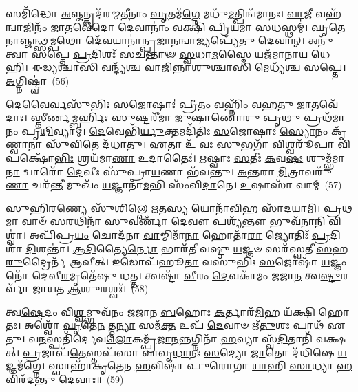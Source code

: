 {\anuvakamend[{𑌰\-\ul{𑌕𑍍𑌷𑌾}\-\-\ul{𑍟}\-𑌸𑍍𑌯𑍗𑌦𑍁᳴𑌮𑍍𑌬𑌰𑍀 𑌆\-\ul{𑌦𑌿}\-𑌤𑍍𑌯 \ul{𑌉}\-𑌦𑍍𑌯\-\ul{𑌤𑍍𑌯} 𑌸़𑌞𑍍𑌚𑌤𑍁᳴𑌰𑍍𑌵𑌿𑍞𑌶𑌤𑌿𑌶𑍍𑌚}]}%

𑌸𑌮𑌿᳴𑌦𑍍𑌧𑍋 \ul{𑌅}\-𑌞𑍍𑌜𑌨𑍍𑌕𑍃𑌦᳴𑌰𑌮𑍍𑌮\-\ul{𑌤𑍀}\-𑌨𑌾𑌂 \ul{𑌘𑍃}\-𑌤𑌮᳴\-\ul{𑌗𑍍𑌨𑍇} 𑌮𑌧𑍁᳴\-\ul{𑌮}\-𑌤𑍍𑌪𑌿𑌨𑍍𑌵᳴𑌮𑌾𑌨𑌃। \ul{𑌵𑌾}\-𑌜𑍀 𑌵𑌹᳴\-\ul{𑌨𑍍𑌵𑌾}\-𑌜𑌿𑌨𑌂᳴ 𑌜𑌾𑌤𑌵𑍇𑌦𑍋 \ul{𑌦𑍇}\-𑌵𑌾𑌨𑌾𑌂॑ 𑌵𑌕𑍍𑌷𑌿 \ul{𑌪𑍍𑌰𑌿}\-𑌯𑌮𑌾 \ul{𑌸}\-𑌧𑌸𑍍𑌥𑌮𑍍॑। \ul{𑌘𑍃}\-𑌤𑍇\-\ul{𑌨𑌾}\-𑌞𑍍𑌜𑌨𑍍𑌥𑍍𑌸\-\ul{𑌮𑍍𑌪}\-𑌥𑍋 𑌦𑍇᳴\-\ul{𑌵}\-𑌯𑌾𑌨𑌾॑𑌨𑍍𑌪𑍍𑌰\-\ul{𑌜𑌾}\-𑌨\-\ul{𑌨𑍍𑌵𑌾}\-𑌜𑍍𑌯𑌪𑍍𑌯𑍇᳴𑌤𑍁 \ul{𑌦𑍇}\-𑌵𑌾𑌨𑍍। 𑌅𑌨𑍁᳴ 𑌤𑍍𑌵𑌾 𑌸𑌪𑍍𑌤𑍇 \ul{𑌪𑍍𑌰}\-𑌦𑌿𑌶𑌃᳴ 𑌸𑌚𑌨𑍍𑌤𑌾𑍟 \ul{𑌸𑍍𑌵}\-𑌧𑌾\-\ul{𑌮}\-𑌸𑍍𑌮𑍈 𑌯𑌜᳴𑌮𑌾𑌨𑌾𑌯 𑌧𑍇𑌹𑌿। 𑌈\-\ul{𑌡𑍍𑌯}\-𑌶𑍍𑌚𑌾\-\ul{𑌸𑌿} 𑌵𑌨𑍍𑌦𑍍𑌯᳴𑌶𑍍𑌚 𑌵𑌾𑌜𑌿\-\ul{𑌨𑍍𑌨𑌾}\-𑌶𑍁𑌶𑍍𑌚𑌾\-\ul{𑌸𑌿} 𑌮𑍇𑌧𑍍𑌯᳴𑌶𑍍𑌚 𑌸𑌪𑍍𑌤𑍇। \ul{𑌅}\-𑌗𑍍𑌨𑌿𑌷𑍍𑌟𑍍𑌵𑌾॑~(56)

\-\ul{𑌦𑍇}\-𑌵𑍈𑌰𑍍𑌵𑌸𑍁᳴𑌭𑌿𑌃 \ul{𑌸}\-𑌜𑍋𑌷𑌾𑌃॑ \ul{𑌪𑍍𑌰𑍀}\-𑌤𑌂 𑌵𑌹𑍍𑌨𑌿𑌂᳴ 𑌵𑌹𑌤𑍁 \ul{𑌜𑌾}\-𑌤𑌵𑍇᳴𑌦𑌾𑌃। \ul{𑌸𑍍𑌤𑍀}\-𑌰𑍍𑌣\-\ul{𑌮𑍍𑌬}\-𑌰𑍍\mbox{}𑌹𑌿𑌃 \ul{𑌸𑍁}\-𑌷𑍍𑌟𑌰𑍀᳴𑌮𑌾 𑌜𑍁\-\ul{𑌷𑌾}\-𑌣𑍋𑌰𑍁 \ul{𑌪𑍃}\-𑌥𑍁 𑌪𑍍𑌰𑌥᳴𑌮𑌾𑌨𑌂 𑌪𑍃\-\ul{𑌥𑌿}\-𑌵𑍍𑌯𑌾𑌮𑍍। \ul{𑌦𑍇}\-𑌵𑍇𑌭𑌿᳴\-\ul{𑌰𑍍𑌯𑍁}\-𑌕𑍍𑌤𑌮𑌦𑌿᳴𑌤𑌿𑌃 \ul{𑌸}\-𑌜𑍋𑌷𑌾𑌃॑ \ul{𑌸𑍍𑌯𑍋}\-𑌨𑌂 𑌕𑍃᳴\-\ul{𑌣𑍍𑌵𑌾}\-𑌨𑌾 𑌸𑍁᳴\-\ul{𑌵𑌿}\-𑌤𑍇 𑌦᳴𑌧𑌾𑌤𑍁। \ul{𑌏}\-𑌤𑌾 𑌉᳴ 𑌵𑌃 \ul{𑌸𑍁}\-𑌭𑌗𑌾᳴ \ul{𑌵𑌿}\-𑌶𑍍𑌵𑌰𑍂᳴\-\ul{𑌪𑌾} 𑌵𑌿 𑌪𑌕𑍍𑌷𑍋᳴\-\ul{𑌭𑌿𑌃} 𑌶𑍍𑌰𑌯᳴𑌮𑌾\-\ul{𑌣𑌾} 𑌉𑌦𑌾𑌤𑍈𑌃॑। \ul{𑌋}\-𑌷𑍍𑌵𑌾𑌃 \ul{𑌸}\-𑌤𑍀𑌃 \ul{𑌕}\-𑌵\-\ul{𑌷𑌃} 𑌶𑍁𑌮𑍍𑌭᳴𑌮𑌾\-\ul{𑌨𑌾} 𑌦𑍍𑌵𑌾𑌰𑍋᳴ \ul{𑌦𑍇}\-𑌵𑍀𑌃 𑌸𑍁᳴𑌪𑍍𑌰𑌾\-\ul{𑌯}\-𑌣𑌾 𑌭᳴𑌵𑌨𑍍𑌤𑍁। \ul{𑌅}\-\-\ul{𑌨𑍍𑌤}\-𑌰𑌾 \ul{𑌮𑌿}\-𑌤𑍍𑌰𑌾𑌵𑌰𑍁᳴\-\ul{𑌣𑌾} 𑌚𑌰᳴\-\ul{𑌨𑍍𑌤𑍀} 𑌮𑍁𑌖𑌂᳴ \ul{𑌯}\-𑌜𑍍𑌞𑌾𑌨𑌾᳴\-\ul{𑌮}\-𑌭𑌿 𑌸𑌂᳴𑌵𑌿\-\ul{𑌦𑌾}\-𑌨𑍇। \ul{𑌉}\-𑌷𑌾𑌸𑌾᳴ 𑌵𑌾𑌮𑍍~(57)

\-\ul{𑌸𑍁}\-\-\ul{𑌹𑌿}\-\-\ul{𑌰}\-𑌣𑍍𑌯𑍇 𑌸𑍁᳴\-\ul{𑌶𑌿}\-𑌲𑍍𑌪𑍇 \ul{𑌋}\-𑌤\-\ul{𑌸𑍍𑌯} 𑌯𑍋𑌨𑌾᳴\-\ul{𑌵𑌿}\-𑌹 𑌸𑌾᳴𑌦𑌯𑌾𑌮𑌿। \ul{𑌪𑍍𑌰}\-\-\ul{𑌥}\-𑌮𑌾 𑌵𑌾𑍞᳴ 𑌸\-\ul{𑌰}\-𑌥𑌿𑌨𑌾᳴ \ul{𑌸𑍁}\-𑌵𑌰𑍍𑌣𑌾᳴ \ul{𑌦𑍇}\-𑌵𑍗 𑌪𑌶𑍍𑌯᳴\-\ul{𑌨𑍍𑌤𑍗} 𑌭𑍁𑌵᳴𑌨𑌾\-\ul{𑌨𑌿} 𑌵𑌿𑌶𑍍𑌵𑌾॑। 𑌅𑌪𑌿᳴𑌪𑍍𑌰\-\ul{𑌯𑌂} 𑌚𑍋𑌦᳴𑌨𑌾 \ul{𑌵𑌾}\-𑌮𑍍𑌮𑌿𑌮𑌾᳴\-\ul{𑌨𑌾} 𑌹𑍋𑌤𑌾᳴\-\ul{𑌰𑌾} 𑌜𑍍𑌯𑍋𑌤𑌿𑌃᳴ \ul{𑌪𑍍𑌰}\-𑌦𑌿𑌶𑌾᳴ \ul{𑌦𑌿}\-𑌶𑌨𑍍𑌤𑌾॑। \ul{𑌆}\-\-\ul{𑌦𑌿}\-𑌤𑍍𑌯𑍈\-\ul{𑌰𑍍𑌨𑍋} 𑌭𑌾𑌰᳴𑌤𑍀 𑌵𑌷𑍍𑌟𑍁 \ul{𑌯}\-𑌜𑍍𑌞𑍞 𑌸𑌰᳴𑌸𑍍𑌵𑌤𑍀 \ul{𑌸}\-𑌹 \ul{𑌰𑍁}\-𑌦𑍍𑌰𑍈𑌰𑍍𑌨᳴ 𑌆𑌵𑍀𑌤𑍍। 𑌇𑌡𑍋𑌪᳴𑌹𑍂\-\ul{𑌤𑌾} 𑌵𑌸𑍁᳴𑌭𑌿𑌃 \ul{𑌸}\-𑌜𑍋𑌷𑌾᳴ \ul{𑌯}\-𑌜𑍍𑌞𑌂 𑌨𑍋᳴ 𑌦𑍇𑌵𑍀\-\ul{𑌰}\-𑌮𑍃𑌤𑍇᳴𑌷𑍁 𑌧𑌤𑍍𑌤। 𑌤𑍍𑌵𑌷𑍍𑌟𑌾᳴ \ul{𑌵𑍀}\-𑌰𑌂 \ul{𑌦𑍇}\-𑌵𑌕𑌾᳴𑌮𑌂 𑌜𑌜𑌾\-\ul{𑌨} 𑌤𑍍𑌵\-\ul{𑌷𑍍𑌟𑍁}\-𑌰𑌰𑍍𑌵𑌾᳴ 𑌜𑌾𑌯𑌤 \ul{𑌆}\-𑌶𑍁𑌰𑌶𑍍𑌵𑌃᳴।~(58)

𑌤𑍍𑌵\-\ul{𑌷𑍍𑌟𑍇}\-𑌦𑌂 𑌵𑌿\-\ul{𑌶𑍍𑌵}\-𑌮𑍍𑌭𑍁𑌵᳴𑌨𑌂 𑌜𑌜𑌾𑌨 \ul{𑌬}\-𑌹𑍋𑌃 \ul{𑌕}\-𑌰𑍍𑌤𑌾𑌰᳴\-\ul{𑌮𑌿}\-𑌹 𑌯᳴𑌕𑍍𑌷𑌿 𑌹𑍋𑌤𑌃। 𑌅𑌶𑍍𑌵𑍋᳴ \ul{𑌘𑍃}\-𑌤𑍇\-\ul{𑌨} 𑌤𑍍𑌮\-\ul{𑌨𑍍𑌯𑌾} 𑌸𑌮᳴\-\ul{𑌕𑍍𑌤} 𑌉𑌪᳴ \ul{𑌦𑍇}\-𑌵𑌾𑍞 𑌋᳴\-\ul{𑌤𑍁}\-𑌶𑌃 𑌪𑌾𑌥᳴ 𑌏𑌤𑍁। 𑌵\-\ul{𑌨}\-𑌸𑍍𑌪𑌤𑌿᳴𑌰𑍍𑌦𑍇𑌵\-\ul{𑌲𑍋}\-𑌕𑌮𑍍𑌪𑍍𑌰᳴\-\ul{𑌜𑌾}\-𑌨\-\ul{𑌨𑍍𑌨}\-𑌗𑍍𑌨𑌿𑌨𑌾᳴ \ul{𑌹}\-𑌵𑍍𑌯𑌾 𑌸𑍍𑌵᳴\-\ul{𑌦𑌿}\-𑌤𑌾𑌨𑌿᳴ 𑌵𑌕𑍍𑌷𑌤𑍍। \ul{𑌪𑍍𑌰}\-𑌜𑌾𑌪᳴\-\ul{𑌤𑍇}\-𑌸𑍍𑌤𑌪᳴𑌸𑌾 𑌵𑌾𑌵𑍃\-\ul{𑌧𑌾}\-𑌨𑌃 \ul{𑌸}\-𑌦𑍍𑌯𑍋 \ul{𑌜𑌾}\-𑌤𑍋 𑌦᳴𑌧𑌿𑌷𑍇 \ul{𑌯}\-𑌜𑍍𑌞𑌮᳴𑌗𑍍𑌨𑍇। 𑌸𑍍𑌵𑌾𑌹𑌾᳴𑌕𑍃𑌤𑍇𑌨 \ul{𑌹}\-𑌵𑌿𑌷𑌾᳴ 𑌪𑍁𑌰𑍋𑌗𑌾 \ul{𑌯𑌾}\-𑌹𑌿 \ul{𑌸𑌾}\-𑌧𑍍𑌯𑌾 \ul{𑌹}\-𑌵𑌿𑌰᳴𑌦𑌨𑍍𑌤𑍁 \ul{𑌦𑍇}\-𑌵𑌾𑌃॥~(59)

